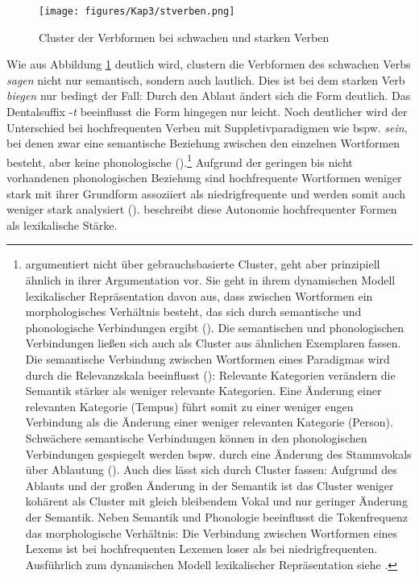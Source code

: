 \begin{figure}
\texttt{[image: figures/Kap3/stverben.png]}  
\caption{Cluster der Verbformen bei schwachen und starken Verben}
\label{clusterverb}
\end{figure}

Wie aus Abbildung \ref{clusterverb} deutlich wird, clustern die Verbformen des schwachen Verbs \textit{sagen} nicht nur semantisch, sondern auch lautlich. Dies ist bei dem starken Verb \textit{biegen} nur bedingt der Fall: Durch den Ablaut ändert sich die Form deutlich. Das Dentalsuffix -\textit{t} beeinflusst die Form hingegen nur leicht. Noch deutlicher wird der Unterschied bei hochfrequenten Verben mit Suppletivparadigmen wie bspw. \textit{sein}, bei denen zwar eine semantische Beziehung zwischen den einzelnen Wortformen besteht, aber keine phonologische (\cite[171]{Bybee.2007}).\footnote{\textcite[118--129]{Bybee.1985} argumentiert nicht über gebrauchsbasierte Cluster, geht aber prinzipiell ähnlich in ihrer Argumentation vor. Sie geht in ihrem dynamischen Modell lexikalischer Repräsentation davon aus, dass zwischen Wortformen ein morphologisches Verhältnis besteht, das sich durch semantische und phonologische Verbindungen ergibt (\cite[118--129]{Bybee.1985}). Die semantischen und phonologischen Verbindungen ließen sich auch als Cluster aus ähnlichen Exemplaren fassen. Die semantische Verbindung zwischen Wortformen eines Paradigmas wird durch die Relevanzskala beeinflusst (\cite[79--81]{Bybee.1991}): Relevante Kategorien verändern die Semantik stärker als weniger relevante Kategorien. Eine Änderung einer relevanten Kategorie (Tempus) führt somit zu einer weniger engen Verbindung als die Änderung einer weniger relevanten Kategorie (Person). Schwächere semantische Verbindungen können in den phonologischen Verbindungen gespiegelt werden bspw. durch eine Änderung des Stammvokals über Ablautung (\cite[170]{Bybee.2007}). Auch dies lässt sich durch Cluster fassen: Aufgrund des Ablauts und der großen Änderung in der Semantik ist das Cluster weniger kohärent als Cluster mit gleich bleibendem Vokal und nur geringer Änderung der Semantik. Neben Semantik und Phonologie beeinflusst die Tokenfrequenz das morphologische Verhältnis: Die Verbindung zwischen Wortformen eines Lexems ist bei hochfrequenten Lexemen loser als bei niedrigfrequenten. Ausführlich zum dynamischen Modell lexikalischer Repräsentation siehe \textcite{Bybee.1985}.} Aufgrund der geringen bis nicht vorhandenen phonologischen Beziehung sind hochfrequente Wortformen weniger stark mit ihrer Grundform assoziiert als niedrigfrequente und werden somit auch weniger stark analysiert (\cite[118]{Bybee.1985}). \textcite[117--118]{Bybee.1985} beschreibt diese Autonomie hochfrequenter Formen als lexikalische Stärke.

